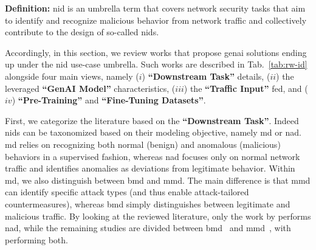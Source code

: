 

\noindent
\textbf{Definition:} \gls{nid}
is an umbrella term that covers network security tasks that aim to identify and recognize malicious behavior from network traffic and collectively contribute to the design of so-called \gls{nids}.

Accordingly, in this section, we review works that propose \gls{genai} solutions ending up under the \gls{nid}
use-case umbrella. 
Such works are described in Tab.~\ref{tab:rw-id} alongside four main views, namely
($i$) \textbf{``Downstream Task''} details,
($ii$) the leveraged \textbf{``GenAI Model''} characteristics,
($iii$) the \textbf{``Traffic Input''} fed, and
($iv$) \textbf{``Pre-Training''}  and \textbf{``Fine-Tuning Datasets''}.


First, we categorize the literature based on the \textbf{``Downstream Task''}.
Indeed \gls{nids} can be taxonomized based on their modeling objective, namely 
\gls{md} or \gls{nad}.
\gls{md} relies on recognizing both normal (benign) and anomalous (malicious) behaviors in a supervised fashion, 
whereas 
\gls{nad} focuses only on normal network traffic and identifies anomalies as deviations from legitimate behavior.
Within \gls{md}, we also distinguish between \gls{bmd} and \gls{mmd}.
The main difference is that \gls{mmd} can identify specific attack types (and thus enable attack-tailored countermeasures), whereas \gls{bmd} simply distinguishes between legitimate and malicious traffic.
%
By looking at the reviewed literature, only the work by \citet{nam2021intrusion} performs \gls{nad}, while the remaining studies are divided between \gls{bmd}~\cite{li2022extreme, seyyar2022attack, ghourabi2022security, lai2023, ullah2023tnn, wang2023robust, meng2023netgpt, manocchio2024flowtransformer, wang2024lens} and \gls{mmd}~\cite{yu2021securing, wu2022, lin2022, ali2023, guthula2023netfound, wang2024lens, wang2024netmamba, wang2024lightweight, melicias2024gpt, ferrag2024},
with~\cite{ho2022network} performing both.
%












